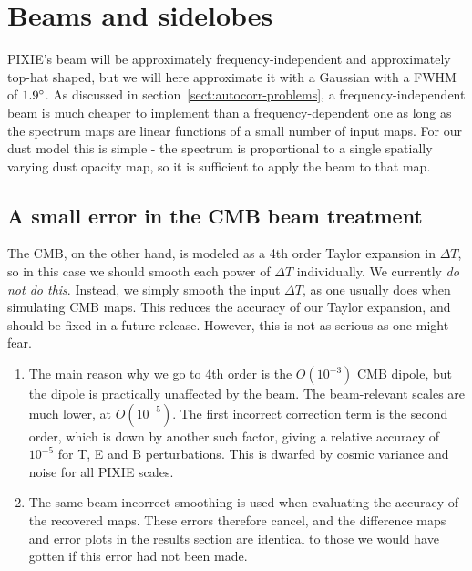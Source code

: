 \documentclass{article}
\begin{document}
\section{Beams and sidelobes}
PIXIE's beam will be approximately frequency-independent and approximately
top-hat shaped, but we will here approximate it with a Gaussian
with a FWHM of $1.9\degree$. As discussed in section~\ref{sect:autocorr-problems},
a frequency-independent beam is much cheaper to implement than a frequency-dependent
one as long as the spectrum maps are linear functions of a small number of input
maps. For our dust model this is simple - the spectrum is proportional
to a single spatially varying dust opacity map, so it is sufficient to apply the
beam to that map.

\subsection{A small error in the CMB beam treatment}
The CMB, on the other hand, is modeled as a 4th order Taylor
expansion in $\Delta T$, so in this case we should smooth each power of $\Delta T$
individually. We currently \emph{do not do this}. Instead, we simply smooth
the input $\Delta T$, as one usually does when simulating CMB maps. This reduces
the accuracy of our Taylor expansion, and should be fixed in a future release.
However, this is not as serious as one might fear.
\begin{enumerate}
	\item The main reason why we go to 4th order is the $O(10^{-3})$ CMB dipole,
		but the dipole is practically unaffected by the beam. The beam-relevant
		scales are much lower, at $O(10^{-5})$. The first incorrect correction
		term is the second order, which is down by another such factor, giving
		a relative accuracy of $10^{-5}$ for T, E and B perturbations. This is
		dwarfed by cosmic variance and noise for all PIXIE scales.
	\item The same beam incorrect smoothing is used when evaluating the accuracy of the
		recovered maps. These errors therefore cancel, and the difference maps and
		error plots in the results section are identical to those we would have gotten
		if this error had not been made.
\end{enumerate}
\end{document}
